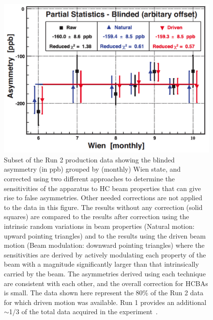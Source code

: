 \begin{singlespace}
\begin{figure}[!h]
	\begin{center}
	\includegraphics[width=12.0cm]{figures/BModNaturalCorrections}
	\end{center}
	\caption
	{Subset of the Run 2 production data showing the blinded asymmetry (in ppb) grouped by (monthly) Wien state, and corrected using two different approaches to determine the sensitivities of the apparatus to HC beam properties that can give rise to false asymmetries. Other needed corrections are not applied to the data in this figure. The results without any correction (solid squares) are compared to the results after correction using the intrinsic random variations in beam properties (Natural motion: upward pointing triangles) and to the results using the driven beam motion (Beam modulation: downward pointing triangles) where the sensitivities are derived by actively modulating each property of the beam with a magnitude significantly larger than that intrinsically carried by the beam. The asymmetries derived using each technique are consistent with each other, and the overall correction for HCBAs is small. The data shown here represent the 80\% of the Run 2 data for which driven motion was available. Run 1 provides an additional $\sim$1/3 of the total data acquired in the experiment~\cite{Allison:2014tpu}.}
	\label{fig:BModNaturalCorrections}
\end{figure}
\end{singlespace}









